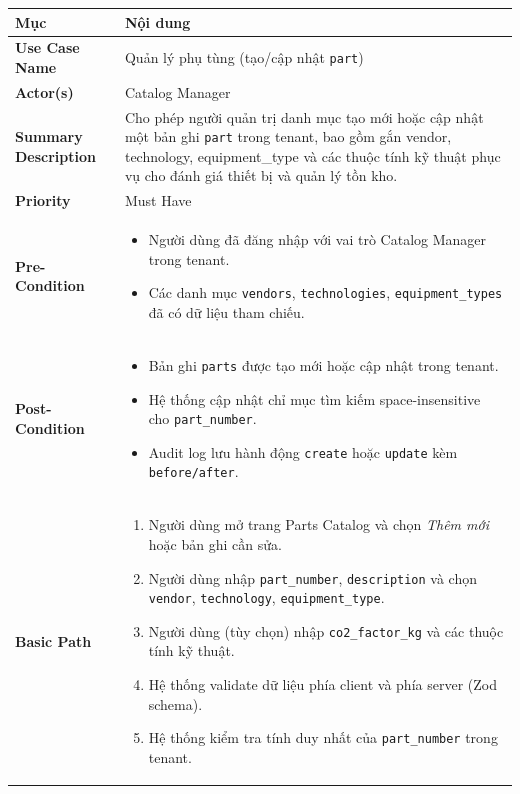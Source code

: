 \begin{xltabular}{\textwidth}{|>{\bfseries}p{4.5cm}|X|}
    \hline
    \textbf{Mục} & \textbf{Nội dung} \\
    \hline
    Use Case Name & Quản lý phụ tùng (tạo/cập nhật \texttt{part}) \\
    \hline
    Actor(s) & Catalog Manager \\
    \hline
    Summary Description & Cho phép người quản trị danh mục tạo mới hoặc cập nhật một bản ghi \texttt{part} trong tenant, bao gồm gắn vendor, technology, equipment\_type và các thuộc tính kỹ thuật phục vụ cho đánh giá thiết bị và quản lý tồn kho. \\
    \hline
    Priority & Must Have \\
    \hline
    Pre-Condition &
    \begin{itemize}[leftmargin=*, nosep]
        \item Người dùng đã đăng nhập với vai trò Catalog Manager trong tenant.
        \item Các danh mục \texttt{vendors}, \texttt{technologies}, \texttt{equipment\_types} đã có dữ liệu tham chiếu.
    \end{itemize} \\
    \hline
    Post-Condition &
    \begin{itemize}[leftmargin=*, nosep]
        \item Bản ghi \texttt{parts} được tạo mới hoặc cập nhật trong tenant.
        \item Hệ thống cập nhật chỉ mục tìm kiếm space-insensitive cho \texttt{part\_number}.
        \item Audit log lưu hành động \texttt{create} hoặc \texttt{update} kèm \texttt{before/after}.
    \end{itemize} \\
    \hline
    Basic Path &
    \begin{enumerate}[leftmargin=*, nosep]
        \item Người dùng mở trang Parts Catalog và chọn \emph{Thêm mới} hoặc bản ghi cần sửa.
        \item Người dùng nhập \texttt{part\_number}, \texttt{description} và chọn \texttt{vendor}, \texttt{technology}, \texttt{equipment\_type}.
        \item Người dùng (tùy chọn) nhập \texttt{co2\_factor\_kg} và các thuộc tính kỹ thuật.
        \item Hệ thống validate dữ liệu phía client và phía server (Zod schema).
        \item Hệ thống kiểm tra tính duy nhất của \texttt{part\_number} trong tenant.

\end{enumerate}
\end{xltabular}
